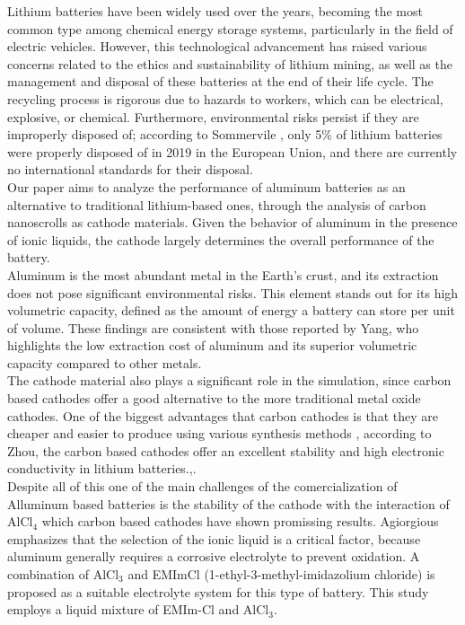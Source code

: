 \documentclass[aps,twocolumn,secnumarabic,nobalancelastpage,amsmath,amssymb,
nofootinbib,floatfix]{revtex4}
\begin{document}
Lithium batteries have been widely used over the years\cite{leisegang2019aluminum}, becoming the most common type among chemical energy storage systems, particularly in the field of electric vehicles\cite{zeng2019commercialization}. However, this technological advancement has raised various concerns related to the ethics and sustainability of lithium mining, as well as the management and disposal of these batteries at the end of their life cycle\cite{mrozik2021environmental}. The recycling process is rigorous due to hazards to workers, which can be electrical, explosive, or chemical\cite{diekmann2017potential}. Furthermore, environmental risks persist if they are improperly disposed of; according to Sommervile \cite{sommerville2020review}, only 5\% of lithium batteries were properly disposed of in 2019 in the European Union, and there are currently no international standards for their disposal\cite{mrozik2021environmental}.\\
Our paper aims to analyze the performance of aluminum batteries as an alternative to traditional lithium-based ones, through the analysis of carbon nanoscrolls as cathode materials\cite{Jung2016Flexible}. Given the behavior of aluminum in the presence of ionic liquids, the cathode largely determines the overall performance of the battery\cite{mishra2022design}.\\
Aluminum is the most abundant metal in the Earth’s crust, and its extraction does not pose significant environmental risks\cite{leisegang2019aluminum}. This element stands out for its high volumetric capacity, defined as the amount of energy a battery can store per unit of volume. These findings are consistent with those reported by Yang, who highlights the low extraction cost of aluminum and its superior volumetric capacity compared to other metals.\\
The cathode material also plays a significant role in the simulation, since carbon based cathodes offer a good alternative to the more traditional metal oxide cathodes. One of the biggest advantages that carbon cathodes is that they are cheaper and easier to produce using various synthesis methods \cite{Wang2018facile,Zhang2018Low}, according to Zhou, the carbon based cathodes offer an excellent stability and high electronic conductivity in lithium batteries.\cite{zhou2022carbon},\cite{gupta2024aluminum}. \\
Despite all of this one of the main challenges of the comercialization of Alluminum based batteries is the stability of the cathode with the interaction of AlCl$_4$ which carbon based cathodes have shown promissing results.\cite{ambroz2017trends}
Agiorgious emphasizes that the selection of the ionic liquid is a critical factor, because aluminum generally requires a corrosive electrolyte to prevent oxidation\cite{agiorgousis2017role}. A combination of AlCl$_3$ and EMImCl (1-ethyl-3-methyl-imidazolium chloride) is proposed as a suitable electrolyte system for this type of battery. This study employs a liquid mixture of EMIm-Cl and AlCl$_3$.\\
\end{document}
